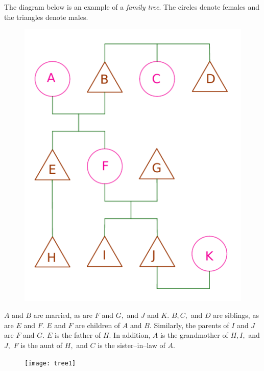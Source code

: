 \begin{multicols}{2}
	The diagram below is an example of a \emph{family tree}. The circles denote females and the triangles denote males.
	\begin{figure}[H]
		\vspace*{-5pt}
		\centering
		\captionsetup{labelformat= empty, justification=centering}
		\includegraphics[width= 0.75\linewidth]{hc-2022-2-3-15-1.pdf}
		\vspace*{-10pt}
	\end{figure}
	$A$ and $B$ are married, as are $F$ and $G,$ and $J$ and $K.$
	\vskip 0.1cm
	$B, C,$ and $D$ are siblings, as are $E$ and $F.$
	$E$ and $F$ are children of $A$ and $B.$
	\vskip 0.1cm
	Similarly, the parents of $I$ and $J$ are $F$ and $G.$
	$E$ is the father of $H.$
	\vskip 0.1cm
	In addition, $A$ is the grandmother of $H, I,$ and $J,$
	$F$ is the aunt of $H,$ and $C$ is the sister--in--law of $A.$
	\begin{figure}[H]
		\vspace*{-5pt}
		\centering
		\captionsetup{labelformat= empty, justification=centering}
		\texttt{[image: tree1]}
	\end{figure}
	
	\vspace*{0.1pt}
	

\end{multicols}
